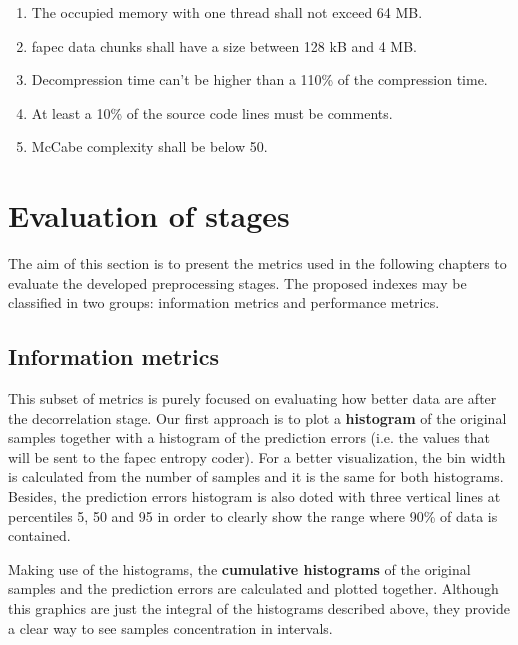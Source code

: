 \begin{enumerate}
	\item The occupied memory with one thread shall not exceed 64 MB.
	\item \acrshort{fapec} data chunks shall have a size between 128 kB and 4 MB. \label{spec:chunk_size}
	\item Decompression time can't be higher than a 110\% of the compression time.
	\item At least a 10\% of the source code lines must be comments.
	\item McCabe complexity \parencite{mccabe} shall be below 50.
\end{enumerate}

\section{Evaluation of stages} \label{sec:metrics}
The aim of this section is to present the metrics used in the following chapters to evaluate the developed preprocessing stages. The proposed indexes may be classified in two groups: information metrics and performance metrics.

\subsection{Information metrics}
This subset of metrics is purely focused on evaluating how better data are after the decorrelation stage. Our first approach is to plot a \textbf{histogram} of the original samples together with a histogram of the prediction errors (i.e. the values that will be sent to the \acrshort{fapec} entropy coder). For a better visualization, the bin width is calculated from the number of samples and it is the same for both histograms. Besides, the prediction errors histogram is also doted with three vertical lines at percentiles 5, 50 and 95 in order to clearly show the range where 90\% of data is contained.

Making use of the histograms, the \textbf{cumulative histograms} of the original samples and the prediction errors are calculated and plotted together. Although this graphics are just the integral of the histograms described above, they provide a clear way to see samples concentration in intervals.

